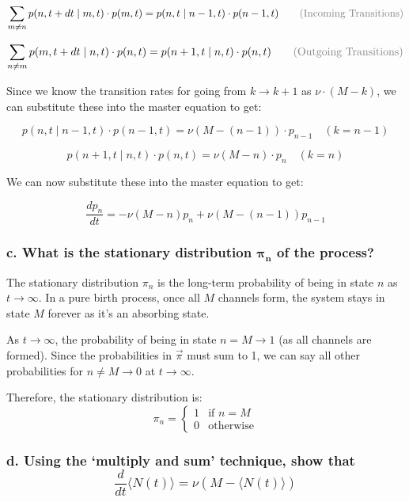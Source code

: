 \documentclass{article}
\begin{document}
\[
    \sum_{m \ne n} p(n, t+dt \mid m, t) \cdot p(m, t) = p(n, t \mid n-1, t) \cdot p(n-1, t) \quad \quad \text{\textcolor{gray}{(Incoming Transitions)}}
\]

\[
    \sum_{n \ne m} p(m, t+dt \mid n, t) \cdot p(n, t) = p(n + 1, t \mid n, t) \cdot p(n, t) \quad \quad \text{\textcolor{gray}{(Outgoing Transitions)}}
\]

Since we know the transition rates for going from $k \rightarrow k+1$ as $\nu
    \cdot (M-k)$, we can substitute these into the master equation to get:

\[
    p(n, t \mid n-1, t) \cdot p(n-1, t) = \nu(M-(n-1)) \cdot p_{n-1} \quad (k = n-1)
\]

\[
    p(n + 1, t \mid n, t) \cdot p(n, t) = \nu(M-n) \cdot p_n \quad (k = n)
\]

We can now substitute these into the master equation to get:

\begin{equation}
    \boxed{\frac{dp_n}{dt} = - \nu(M-n)p_n + \nu(M-(n-1))p_{n-1}}
\end{equation}

\subsubsection*{c. What is the stationary distribution $\mathbf{\pi_{n}}$ of the process?}
The stationary distribution $\pi_n$ is the long-term probability of being in state $n$ as $t \rightarrow \infty$. In a pure birth process, once all $M$ channels form, the system stays in state $M$ forever as it's an absorbing state.

As $t \rightarrow \infty$, the probability of being in state $n=M \rightarrow
    1$ (as all channels are formed). Since the probabilities in $\vec{\pi}$ must
sum to 1, we can say all other probabilities for $n \neq M \rightarrow 0$ at $t
    \rightarrow \infty$.

Therefore, the stationary distribution is:
\[
    \pi_n = \begin{cases}
        1 & \text{if } n = M \\
        0 & \text{otherwise}
    \end{cases}
\]
\subsubsection*{d. Using the `multiply and sum' technique, show that
    \[
        \frac{d}{dt}
        \langle N(t) \rangle = \nu(M - \langle N(t) \rangle)
    \]}
\end{document}
